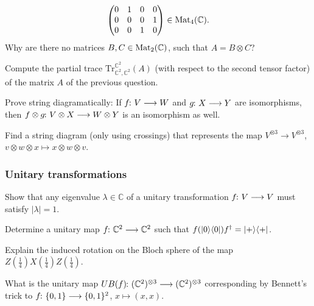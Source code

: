 \documentclass[a4paper, oneside, 12pt]{amsart}
\begin{document}
\begin{thmlist}
\begin{equation*}
\begin{pmatrix}
    0 & 1 & 0 & 0 \\
    0 & 0 & 0 & 1 \\
    0 & 0 & 1 & 0
  \end{pmatrix} \in \operatorname{Mat}_{4}(\mathbb{C}).
\end{equation*}
  Why are there no matrices \(B, C \in \operatorname{Mat}_{2}( \mathbb{C})\), such that \(A= B\otimes C\)?
  \item Compute the partial trace \(\mathrm{Tr}_{ \mathbb{C}^{2}, \mathbb{C}^{2}}^{ \mathbb{C}^{2}}(A)\) (with respect to the second tensor factor) of the matrix \(A\) of the previous question.
  \item Prove string diagramatically: If \(f \from V \to W\) and \(g \from X \to Y\) are isomorphisms, then \(f\otimes g \from V\otimes X \to W\otimes Y\) is an isomorphism as well.
  \item Find a string diagram (only using crossings) that represents the map \(V^{\otimes 3}\to V^{\otimes 3}\),
  \(v\otimes w \otimes x \mapsto x \otimes w \otimes v\).
\end{thmlist}

\subsubsection*{Unitary transformations}
\begin{thmlist}
  \item Show that any eigenvalue \(\lambda \in \mathbb{C}\) of a unitary transformation \(f \from V\to V\) must satisfy \(|\lambda| = 1\).
  \item Determine a unitary map \(f\from \mathbb{C}^{2} \to \mathbb{C}^{2}\) such that \(f (\lvert0\rangle\langle0\rvert) f^{\dagger} = \lvert+\rangle\langle+\rvert\).
  \item Explain the induced rotation on the Bloch sphere of the map \(Z(\tfrac{1}{4}) X(\tfrac{1}{4}) Z(\tfrac{1}{4})\).
  \item What is the unitary map \(UB(f) \from (\mathbb{C}^{2})^{\otimes 3}\to (\mathbb{C}^{2})^{\otimes 3}\) corresponding by Bennett's trick to \(f \from\{0,1\} \to\{0,1\}^{2}\), \(x \mapsto (x, x)\).
\end{thmlist}
\end{document}
